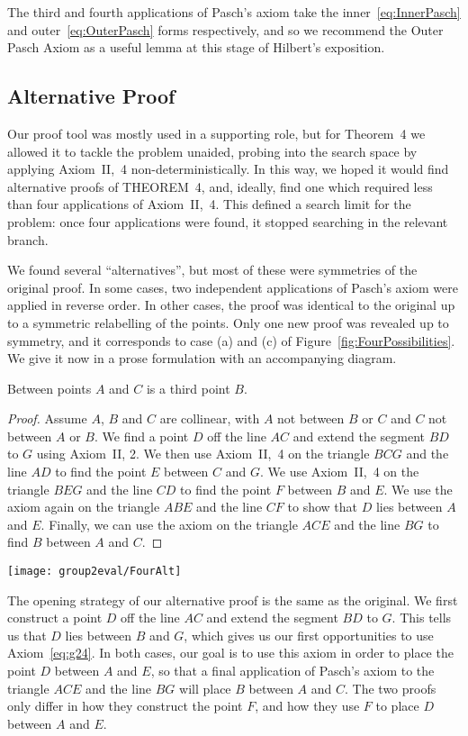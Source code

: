 The third and fourth applications of Pasch's axiom take the inner~\eqref{eq:InnerPasch} and outer~\eqref{eq:OuterPasch} forms respectively, and so we recommend the Outer Pasch Axiom as a useful lemma at this stage of Hilbert's exposition.

\subsection{Alternative Proof}\label{sec:FourAlternative}
Our proof tool was mostly used in a supporting role, but for Theorem~4 we allowed it to tackle the problem unaided, probing into the search space by applying Axiom~II,~4 non-deterministically. In this way, we hoped it would find alternative proofs of THEOREM~4, and, ideally, find one which required less than four applications of Axiom~II,~4. This defined a search limit for the problem: once four applications were found, it stopped searching in the relevant branch. 

We found several ``alternatives'', but most of these were symmetries of the original proof. In some cases, two independent applications of Pasch's axiom were applied in reverse order. In other cases, the proof was identical to the original up to a symmetric relabelling of the points. Only one new proof was revealed up to symmetry, and it corresponds to case (a) and (c) of Figure~\ref{fig:FourPossibilities}. We give it now in a prose formulation with an accompanying diagram.

\begin{proposition}
Between points $A$ and $C$ is a third point $B$.
\end{proposition}
\begin{proof}Assume $A$, $B$ and $C$ are collinear, with $A$ not between $B$ or $C$ and $C$ not between $A$ or $B$. We find a point $D$ off the line $AC$ and extend the segment $BD$ to $G$ using Axiom~II, 2. We then use Axiom~II,~4 on the triangle $BCG$ and the line $AD$ to find the point $E$ between $C$ and $G$. We use Axiom~II,~4 on the triangle $BEG$ and the line $CD$ to find the point $F$ between $B$ and $E$. We use the axiom again on the triangle $ABE$ and the line $CF$ to show that $D$ lies between $A$ and $E$. Finally, we can use the axiom on the triangle $ACE$ and the line $BG$ to find $B$ between $A$ and $C$.
\end{proof}
\begin{center}\texttt{[image: group2eval/FourAlt]}
\end{center}

The opening strategy of our alternative proof is the same as the original. We first construct a point $D$ off the line $AC$ and extend the segment $BD$ to $G$. This tells us that $D$ lies between $B$ and $G$, which gives us our first opportunities to use Axiom~\ref{eq:g24}. In both cases, our goal is to use this axiom in order to place the point $D$ between $A$ and $E$, so that a final application of Pasch's axiom to the triangle $ACE$ and the line $BG$ will place $B$ between $A$ and $C$. The two proofs only differ in how they construct the point $F$, and how they use $F$ to place $D$ between $A$ and $E$.

